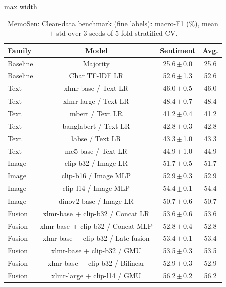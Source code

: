 \begin{table}[t]
\centering
\small
\caption{MemoSen: Clean-data benchmark (fine labels): macro-F1 (\%), mean $\pm$ std over 3 seeds of 5-fold stratified CV.}
\label{tab:bench_fine_memosen}
\begin{adjustbox}{max width=\textwidth}
\begin{tabular}{lccc}
\toprule
Family & Model & Sentiment & Avg. \\
\midrule
Baseline & Majority & 25.6\,$\pm$\,0.0 & 25.6 \\
Baseline & Char TF-IDF LR & 52.6\,$\pm$\,1.3 & 52.6 \\
Text & xlmr-base / Text LR & 46.0\,$\pm$\,0.5 & 46.0 \\
Text & xlmr-large / Text LR & 48.4\,$\pm$\,0.7 & 48.4 \\
Text & mbert / Text LR & 41.2\,$\pm$\,0.4 & 41.2 \\
Text & banglabert / Text LR & 42.8\,$\pm$\,0.3 & 42.8 \\
Text & labse / Text LR & 43.3\,$\pm$\,1.0 & 43.3 \\
Text & me5-base / Text LR & 44.9\,$\pm$\,1.0 & 44.9 \\
Image & clip-b32 / Image LR & 51.7\,$\pm$\,0.5 & 51.7 \\
Image & clip-b16 / Image MLP & 52.9\,$\pm$\,0.3 & 52.9 \\
Image & clip-l14 / Image MLP & 54.4\,$\pm$\,0.1 & 54.4 \\
Image & dinov2-base / Image LR & 50.7\,$\pm$\,0.6 & 50.7 \\
Fusion & xlmr-base + clip-b32 / Concat LR & 53.6\,$\pm$\,0.6 & 53.6 \\
Fusion & xlmr-base + clip-b32 / Concat MLP & 52.8\,$\pm$\,0.4 & 52.8 \\
Fusion & xlmr-base + clip-b32 / Late fusion & 53.4\,$\pm$\,0.1 & 53.4 \\
Fusion & xlmr-base + clip-b32 / GMU & 53.5\,$\pm$\,0.3 & 53.5 \\
Fusion & xlmr-base + clip-b32 / Bilinear & 52.9\,$\pm$\,0.3 & 52.9 \\
Fusion & xlmr-large + clip-l14 / GMU & 56.2\,$\pm$\,0.2 & 56.2 \\
\bottomrule
\end{tabular}
\end{adjustbox}
\end{table}
